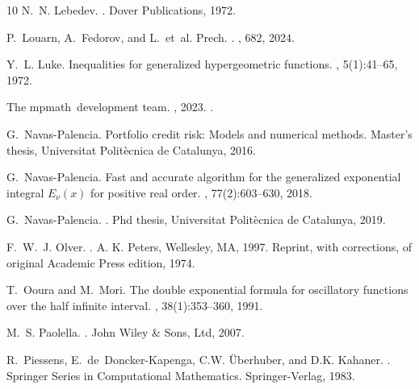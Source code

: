 \documentclass[10pt,a4paper,oneside]{article}
\numberwithin{equation}{section}
\begin{document}
\begin{thebibliography}{10}
N.~N. Lebedev.
.
\newblock Dover Publications, 1972.

P.~Louarn, A.~Fedorov, and L.~et~al. Prech.
.
, 682, 2024.

Y.~L. Luke.
\newblock Inequalities for generalized hypergeometric functions.
, 5(1):41--65, 1972.

The mpmath~development team.
, 2023.
.

G.~Navas-Palencia.
\newblock Portfolio credit risk: Models and numerical methods.
\newblock Master's thesis, Universitat Polit\`{e}cnica de Catalunya, 2016.

G.~Navas-Palencia.
\newblock Fast and accurate algorithm for the generalized exponential integral
  ${E}_{\nu}(x)$ for positive real order.
, 77(2):603--630, 2018.

G.~Navas-Palencia.
.
\newblock Phd thesis, Universitat Polit\`{e}cnica de Catalunya, 2019.

F.~W.~J. Olver.
.
\newblock A. K. Peters, Wellesley, MA, 1997.
\newblock Reprint, with corrections, of original Academic Press edition, 1974.

T.~Ooura and M.~Mori.
\newblock The double exponential formula for oscillatory functions over the
  half infinite interval.
,
  38(1):353--360, 1991.

M.~S. Paolella.
.
\newblock John Wiley \& Sons, Ltd, 2007.

R.~Piessens, E.~de~Doncker-Kapenga, C.W. {\"U}berhuber, and D.K. Kahaner.
.
\newblock Springer Series in Computational Mathematics. Springer-Verlag, 1983.


\end{thebibliography}
\end{document}
